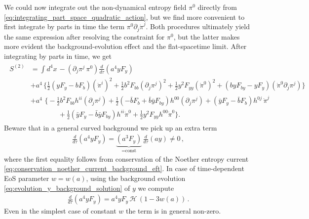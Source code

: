 We could now integrate out the non-dynamical entropy field $\pi^0$ directly from \eqref{eq:integrating_part_space_quadratic_action}, but we find more convenient to first integrate by parts in time the term $\pi^0 \partial_j\dot{\pi}^j$.
Both procedures ultimately yield the same expression after resolving the constraint for $\pi^0$, but the latter makes more evident the background-evolution effect and the flat-spacetime limit.
After integrating by parts in time, we get
{\small\begin{align}\label{eq:integrating_part_time_quadratic_action}
\begin{aligned}
    S^{(2)}&=\int d^4x\, -(\partial_j \pi^j\, \pi^{0})\tfrac{d}{d\tau}(a^4yF_y)\\
    &+a^4\,\bigg\{
    \tfrac12 (yF_y-bF_b) (\dot{\pi}^i)^2+ \tfrac12 b^2 F_{bb} (\partial_j \pi^j)^2 +\tfrac12 y^2 F_{yy} (\dot{\pi}^0)^2+(b y F_{by}-yF_y) (\dot{\pi}^0 \partial_j \pi^j)\bigg\}\\
    &+ a^4\,\,\bigg\{
    -\tfrac12 b^2 F_{bb} h^{ii}(\partial_j \pi^j)
    + \tfrac12\!\left(-\bar{b}F_b + \bar{b}\bar{y}F_{by}\right) h^{00}(\partial_j \pi^j)+\left(\bar{y}F_y - \bar{b}F_b\right) h^{0 j}\,\dot{\pi}^j\\
    &\qquad\qquad +\tfrac12\!\left(\bar{y}F_y - \bar{b}\bar{y}F_{by}\right) h^{ii}\dot{\pi}^0
    + \tfrac12 y^2 F_{yy} h^{00}\dot{\pi}^0
    \bigg\}.
\end{aligned}
\end{align}}
Beware that in a general curved background we pick up an extra term
{\small\begin{align}\label{eq:nontrivial_integ_by_part_time_curved}
    \tfrac{d}{d\tau}(a^4yF_y)=\underbrace{(a^3F_y)}_{=\text{const}}\, \tfrac{d}{d\tau}(ay)\neq 0\,,
\end{align}}
where the first equality follows from conservation of the Noether entropy current \eqref{eq:conservation_noether_current_background_eft}.
In case of time-dependent EoS parameter $w=w(a)$, using the background evolution \eqref{eq:evolution_y_background_solution} of $y$ we compute
{\small\begin{align}\label{eq:integ_part_time_nontrivial_term_a_dependent_eos}
    \tfrac{d}{d\tau}(a^4yF_y)=a^4 yF_y\, \mathcal{H}\, (1-3w(a))\,.
\end{align}}
Even in the simplest case of constant $w$ the term is in general non-zero.

